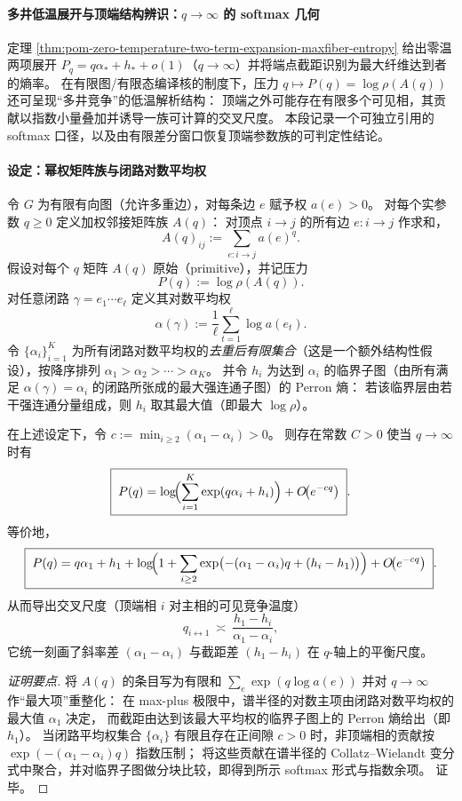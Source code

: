 
\paragraph{多井低温展开与顶端结构辨识：\texorpdfstring{$q\to\infty$}{q->∞} 的 softmax 几何}
定理 \ref{thm:pom-zero-temperature-two-term-expansion-maxfiber-entropy} 给出零温两项展开
\(
P_q=q\alpha_\ast+h_\ast+o(1)
\)（\(q\to\infty\)）并将端点截距识别为最大纤维达到者的熵率。
在有限图/有限态编译核的制度下，压力 \(q\mapsto P(q)=\log\rho(A(q))\) 还可呈现“多井竞争”的低温解析结构：
顶端之外可能存在有限多个可见相，其贡献以指数小量叠加并诱导一族可计算的交叉尺度。
本段记录一个可独立引用的 softmax 口径，以及由有限差分窗口恢复顶端参数族的可判定性结论。

\paragraph{设定：幂权矩阵族与闭路对数平均权}
令 \(G\) 为有限有向图（允许多重边），对每条边 \(e\) 赋予权 \(a(e)>0\)。
对每个实参数 \(q\ge0\) 定义加权邻接矩阵族 \(A(q)\)：
对顶点 \(i\to j\) 的所有边 \(e:i\to j\) 作求和，
\[
A(q)_{ij}:=\sum_{e:i\to j} a(e)^q.
\]
假设对每个 \(q\) 矩阵 \(A(q)\) 原始（primitive），并记压力
\[
P(q):=\log\rho(A(q)).
\]
对任意闭路 \(\gamma=e_1\cdots e_\ell\) 定义其对数平均权
\[
\alpha(\gamma):=\frac{1}{\ell}\sum_{t=1}^{\ell}\log a(e_t).
\]
令 \(\{\alpha_i\}_{i=1}^K\) 为所有闭路对数平均权的\emph{去重后有限集合}（这是一个额外结构性假设），按降序排列
\(
\alpha_1>\alpha_2>\cdots>\alpha_K
\)。
并令 \(h_i\) 为达到 \(\alpha_i\) 的临界子图（由所有满足 \(\alpha(\gamma)=\alpha_i\) 的闭路所张成的最大强连通子图）的 Perron 熵：
若该临界层由若干强连通分量组成，则 \(h_i\) 取其最大值（即最大 \(\log\rho\)）。

\begin{theorem}\label{thm:pom-multiwell-softmax-low-temperature-expansion}
在上述设定下，令
\(
c:=\min_{i\ge2}(\alpha_1-\alpha_i)>0
\)。
则存在常数 \(C>0\) 使当 \(q\to\infty\) 时有
\[
\boxed{\;
P(q)=\log\!\Bigl(\sum_{i=1}^{K}\exp(q\alpha_i+h_i)\Bigr)+O\!\bigl(e^{-cq}\bigr)\; }.
\]
等价地，
\[
\boxed{\;
P(q)=q\alpha_1+h_1+\log\!\Bigl(1+\sum_{i\ge2}\exp\bigl(-(\alpha_1-\alpha_i)q+(h_i-h_1)\bigr)\Bigr)+O\!\bigl(e^{-cq}\bigr)\; }.
\]
从而导出交叉尺度（顶端相 \(i\) 对主相的可见竞争温度）
\[
q_{i\leftrightarrow 1}\ \asymp\ \frac{h_1-h_i}{\alpha_1-\alpha_i},
\]
它统一刻画了斜率差 \((\alpha_1-\alpha_i)\) 与截距差 \((h_1-h_i)\) 在 \(q\)-轴上的平衡尺度。
\end{theorem}
\begin{proof}[证明要点]
将 \(A(q)\) 的条目写为有限和 \(\sum_e \exp(q\log a(e))\) 并对 \(q\to\infty\) 作“最大项”重整化：
在 max-plus 极限中，谱半径的对数主项由闭路对数平均权的最大值 \(\alpha_1\) 决定，
而截距由达到该最大平均权的临界子图上的 Perron 熵给出（即 \(h_1\)）。
当闭路平均权集合 \(\{\alpha_i\}\) 有限且存在正间隙 \(c>0\) 时，非顶端相的贡献按 \(\exp(-(\alpha_1-\alpha_i)q)\) 指数压制；
将这些贡献在谱半径的 Collatz--Wielandt 变分式中聚合，并对临界子图做分块比较，即得到所示 softmax 形式与指数余项。
证毕。
\end{proof}

